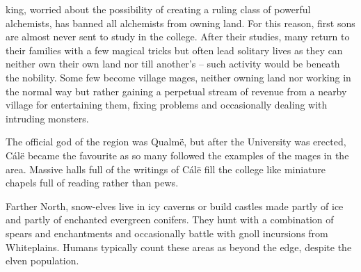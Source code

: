 \begin{multicols}{2}
\Gls{king}, worried about the possibility of creating a ruling class of powerful alchemists, has banned all alchemists from owning land.
For this reason, first sons are almost never sent to study in the college.
After their studies, many return to their families with a few magical tricks but often lead solitary lives as they can neither own their own land nor till another's -- such activity would be beneath the nobility.
Some few become village mages, neither owning land nor working in the normal way but rather gaining a perpetual stream of revenue from a nearby village for entertaining them, fixing problems and occasionally dealing with intruding monsters.

The official god of the region was Qualm\"{e}, but after the University was erected, C\'{a}l\"{e} became the favourite as so many followed the examples of the mages in the area.
Massive halls full of the writings of C\'{a}l\"{e} fill the college like miniature chapels full of reading rather than pews.

Farther North, snow-elves live in icy caverns or build castles made partly of ice and partly of enchanted evergreen conifers.
They hunt with a combination of spears and enchantments and occasionally battle with gnoll incursions from Whiteplains.
Humans typically count these areas as beyond the \gls{edge}, despite the elven population.

\iftoggle{players}{
  \subsubsection{Walking in the Snow}
  Eastlake's snow is a menace to anyone trying to travel, but it's never worse than when it melts.
  The warmer seasons bring floods along all rivers, and at the base of every mountain, which just about covers all of Eastlake.

  Throughout the more normal weather, you might be lucky enough to encounter a vegetable trader from some other kingd\ldots er, `region'.
  Less lucky travellers might be able to trade with one of the local snow elves for whatever they happen to have caught.
  \emph{Really} unlucky travellers might just be caught by those snow elves.
  They say the older ones sometimes eat people or dwarves.
  \footnote{They never eat gnomes. Maybe gnomes taste really bad?}

}{
  \subsection{Encounters}
  Despite being a dangerous area, Eastlake's slow climate means danger does not swing around very often.

}
\end{multicols}

